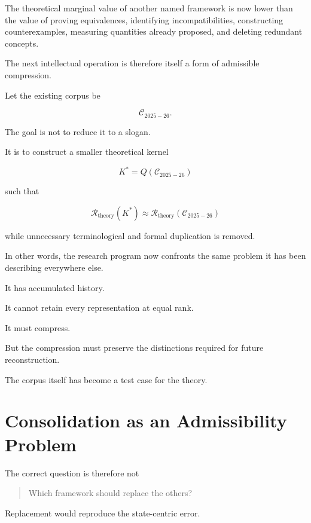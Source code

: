 \documentclass[11pt]{article}
\theoremstyle{remark}
\newcommand{\Reach}{\mathcal{R}}
\begin{document}
The theoretical marginal value of another named framework is now lower than the value of proving equivalences, identifying incompatibilities, constructing counterexamples, measuring quantities already proposed, and deleting redundant concepts.

The next intellectual operation is therefore itself a form of admissible compression.

Let the existing corpus be

\begin{equation}
\mathcal{C}_{2025-26}.
\end{equation}

The goal is not to reduce it to a slogan.

It is to construct a smaller theoretical kernel

\begin{equation}
K^\ast
=
Q(\mathcal{C}_{2025-26})
\end{equation}

such that

\begin{equation}
\Reach_{\mathrm{theory}}(K^\ast)
\approx
\Reach_{\mathrm{theory}}
(
\mathcal{C}_{2025-26}
)
\end{equation}

while unnecessary terminological and formal duplication is removed.

In other words, the research program now confronts the same problem it has been describing everywhere else.

It has accumulated history.

It cannot retain every representation at equal rank.

It must compress.

But the compression must preserve the distinctions required for future reconstruction.

The corpus itself has become a test case for the theory.

\section{Consolidation as an Admissibility Problem}

The correct question is therefore not

\begin{quote}
Which framework should replace the others?
\end{quote}

Replacement would reproduce the state-centric error.
\end{document}
